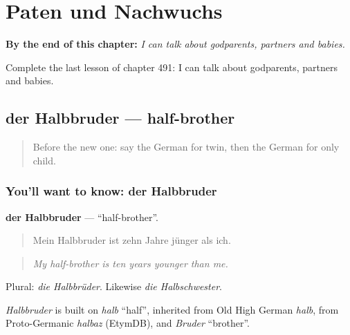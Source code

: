 
\chapter{Paten und Nachwuchs}
\label{ch:ge-paten-und-nachwuchs}

\begin{chapteropening}
\textbf{By the end of this chapter:} \emph{I can talk about godparents, partners and babies.}

Complete the last lesson of chapter 491: I can talk about godparents, partners and babies.
\end{chapteropening}

\section[der Halbbruder]{der Halbbruder — half-brother}

\label{lesson:GE-C491-halbbruder}



\begin{quote}
Before the new one: say the German for twin, then the German for only child.
\end{quote}

\subsection*{You'll want to know: der Halbbruder}
\textbf{der Halbbruder} — \textquotedblleft{}half-brother\textquotedblright{}.

\begin{quote}
Mein Halbbruder ist zehn Jahre jünger als ich.
\end{quote}

\begin{quote}
\emph{My half-brother is ten years younger than me.}
\end{quote}

Plural: \emph{die Halbbrüder}. Likewise \emph{die Halbschwester}.

\begin{cousinweb}
\emph{Halbbruder} is built on \emph{halb} \textquotedblleft{}half\textquotedblright{}, inherited from Old High German \emph{halb}, from Proto-Germanic \emph{halbaz} (EtymDB), and \emph{Bruder} \textquotedblleft{}brother\textquotedblright{}.
\end{cousinweb}

